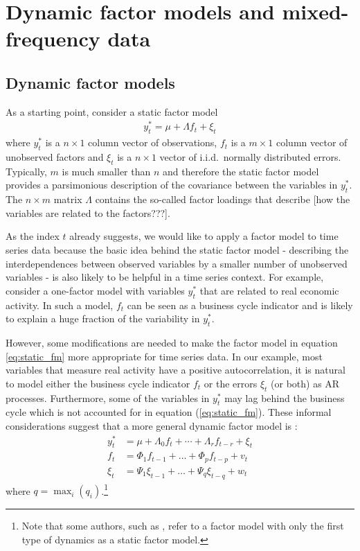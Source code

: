 \chapter{Dynamic factor models and mixed-frequency data}

\section{Dynamic factor models}


As a starting point, consider a static factor model
\begin{align}
y^*_t = \mu + \Lambda f_t + \xi_t \label{eq:static_fm}
\end{align}
where $y^*_t$ is a $n \times 1$ column vector of observations, $f_t$ is a $m \times 1$ column vector of unobserved factors and $\xi_t$ is a $n \times 1$ vector of i.i.d.~normally distributed errors. Typically, $m$ is much smaller than $n$ and therefore the static factor model provides a parsimonious description of the covariance between the variables in $y^*_t$. The $n \times m$ matrix $\Lambda$ contains the so-called factor loadings that describe [how the variables are related to the factors???]. %

As the index $t$ already suggests, we would like to apply a factor model to time series data because the basic idea behind the static factor model - describing the interdependences between observed variables by a smaller number of unobserved variables - is also likely to be helpful in a time series context. For example, consider a one-factor model with variables $y^*_t$ that are related to real economic activity. In such a model, $f_t$ can be seen as a business cycle indicator and is likely to explain a huge fraction of the variability in $y^*_t$. 

However, some modifications are needed to make the factor model in equation \ref{eq:static_fm} more appropriate for time series data. In our example, most variables that measure real activity have a positive autocorrelation, it is natural to model either the business cycle indicator $f_t$ or the errors $\xi_t$ (or both) as AR processes. Furthermore, some of the variables in $y^*_t$ may lag behind the business cycle which is not accounted for in equation (\ref{eq:static_fm}). These informal considerations suggest that a more general dynamic factor model is \citep{BaiWang2015}: 
\begin{align}
y^*_t &= \mu + \Lambda_0 f_t + \cdots + \Lambda_{r} f_{t-r} + \xi_t \\
f_t &= \Phi_1 f_{t-1} + \dots + \Phi_p f_{t-p} + v_t   \\
\xi_{t} &= \Psi_{1} \xi_{t-1} + \dots + \Psi_{q} \xi_{t-q} + w_{t}   
\end{align}
where $q=\max_i(q_i)$.\footnote{
	Note that some authors, such as \citet{BaiWang2015}, refer to a factor model with only the first type of dynamics as a static factor model.
}\\ %

